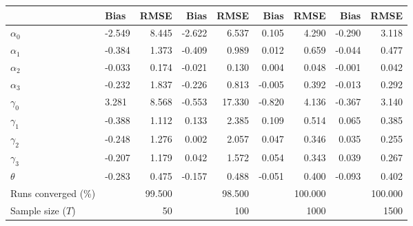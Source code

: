 
\begin{tabular}[t]{llrrrrrrr}
\toprule
  & Bias & RMSE & Bias & RMSE & Bias & RMSE & Bias & RMSE\\
\midrule
$\alpha_{0}$ & -2.549 & 8.445 & -2.622 & 6.537 & 0.105 & 4.290 & -0.290 & 3.118\\
$\alpha_{1}$ & -0.384 & 1.373 & -0.409 & 0.989 & 0.012 & 0.659 & -0.044 & 0.477\\
$\alpha_{2}$ & -0.033 & 0.174 & -0.021 & 0.130 & 0.004 & 0.048 & -0.001 & 0.042\\
$\alpha_{3}$ & -0.232 & 1.837 & -0.226 & 0.813 & -0.005 & 0.392 & -0.013 & 0.292\\
$\gamma_{0}$ & 3.281 & 8.568 & -0.553 & 17.330 & -0.820 & 4.136 & -0.367 & 3.140\\
$\gamma_{1}$ & -0.388 & 1.112 & 0.133 & 2.385 & 0.109 & 0.514 & 0.065 & 0.385\\
$\gamma_{2}$ & -0.248 & 1.276 & 0.002 & 2.057 & 0.047 & 0.346 & 0.035 & 0.255\\
$\gamma_{3}$ & -0.207 & 1.179 & 0.042 & 1.572 & 0.054 & 0.343 & 0.039 & 0.267\\
$\theta$ & -0.283 & 0.475 & -0.157 & 0.488 & -0.051 & 0.400 & -0.093 & 0.402\\
Runs converged (\%) &  & 99.500 &  & 98.500 &  & 100.000 &  & 100.000\\
Sample size ($T$) &  & 50 &  & 100 &  & 1000 &  & 1500\\
\bottomrule
\end{tabular}
